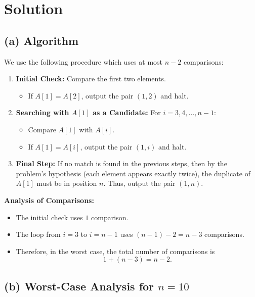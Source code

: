 \documentclass[11pt]{article}
\begin{document}
    \section*{Solution}
    \subsection*{(a) Algorithm}

    We use the following procedure which uses at most \( n-2 \) comparisons:
    
    \begin{enumerate}
        \item \textbf{Initial Check:} Compare the first two elements.
        \begin{itemize}
            \item If \( A[1] = A[2] \), output the pair \((1,2)\) and halt.
        \end{itemize}
        
        \item \textbf{Searching with \( A[1] \) as a Candidate:}  
        For \( i = 3, 4, \dots, n-1 \):
        \begin{itemize}
            \item Compare \( A[1] \) with \( A[i] \).
            \item If \( A[1] = A[i] \), output the pair \((1,i)\) and halt.
        \end{itemize}
        
        \item \textbf{Final Step:}  
        If no match is found in the previous steps, then by the problem's hypothesis (each element appears exactly twice), the duplicate of \( A[1] \) must be in position \( n \). Thus, output the pair \((1,n)\).
    \end{enumerate}
    
    \textbf{Analysis of Comparisons:}
    
    \begin{itemize}
        \item The initial check uses \( 1 \) comparison.
        \item The loop from \( i = 3 \) to \( i = n-1 \) uses \( (n-1) - 2 = n-3 \) comparisons.
        \item Therefore, in the worst case, the total number of comparisons is 
        \[
        1 + (n-3) = n-2.
        \]
    \end{itemize}
    
    \subsection*{(b) Worst-Case Analysis for \( n = 10 \)}
    
\end{document}
